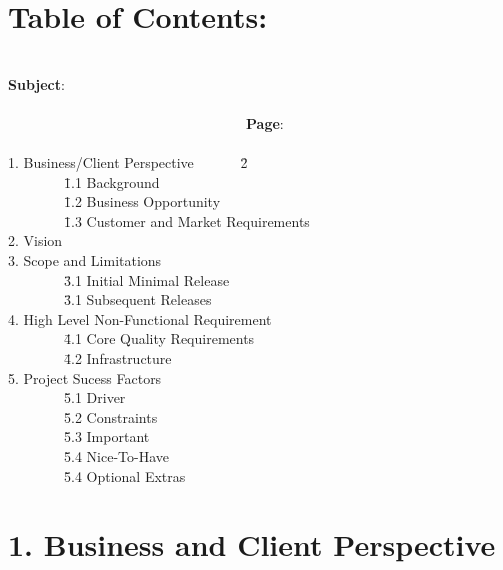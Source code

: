 \documentclass[29pt,a4paper]{moderncv}
\begin{document}
\section{\textbf{Table of Contents:}}
\begin{tabbing}
\\\textbf{Subject}: ~~~~~~~~~~~~~~~~~~~~~~~~~~~~~~~~~~~~~~~~~~~~~~~~~~~~~~~~~~~~~~~~~~~~~~~~~~~~~~~~~~~~~~~~~~~~~~~~~~~~~~~~~~\= \textbf{Page}:
\\\newline
	\\1. Business/Client Perspective \> ~~~~~~\= 2
		\\~~~~~~~~\= 1.1 Background 
		\\~~~~~~~~\= 1.2 Business Opportunity 
		\\~~~~~~~~\= 1.3 Customer and Market Requirements 
	\\2. Vision \> \> 3
	\\3. Scope and Limitations \> 
		\\~~~~~~~~\= 3.1 Initial Minimal Release 
		\\~~~~~~~~\= 3.1 Subsequent Releases  
	\\4. High Level Non-Functional Requirement \> 
		\\~~~~~~~~\= 4.1 Core Quality Requirements 
		\\~~~~~~~~\= 4.2 Infrastructure  
	\\5. Project Sucess Factors \> \> 4
		\\~~~~~~~~\= 5.1 Driver 
		\\~~~~~~~~\= 5.2 Constraints 
		\\~~~~~~~~\= 5.3 Important
		\\~~~~~~~~\= 5.4 Nice-To-Have
		\\~~~~~~~~\= 5.4 Optional Extras

\end{tabbing}
\newpage
	\section*{\textbf{1. Business and Client Perspective}}
	\vspace{4mm}

	\vspace{5mm}
	
\end{document}

